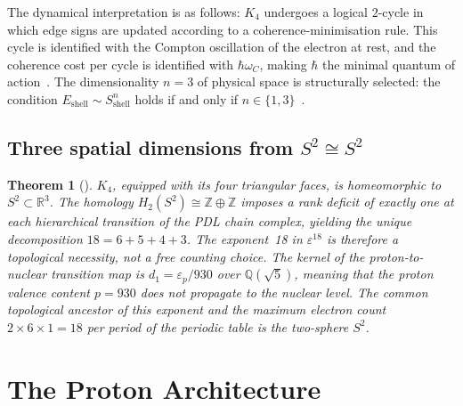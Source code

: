 \documentclass[11pt,a4paper]{article}
\theoremstyle{plain}
\newtheorem{theorem}{Theorem}[section]
\theoremstyle{definition}
\theoremstyle{remark}
\newcommand{\Kfour}{K_4}
\begin{document}
The dynamical interpretation is as follows: $\Kfour$ undergoes a logical $2$-cycle in which edge signs are updated according to a coherence-minimisation rule. This cycle is identified with the Compton oscillation of the electron at rest, and the coherence cost per cycle is identified with $\hbar\omega_C$, making $\hbar$ the minimal quantum of action~\cite{D01,D02}. The dimensionality $n=3$ of physical space is structurally selected: the condition $E_{\mathrm{shell}}\sim S_{\mathrm{shell}}^n$ holds if and only if $n\in\{1,3\}$~\cite{D23}.

\subsection{Three spatial dimensions from \texorpdfstring{$S^2\cong S^2$}{S² ≅ S²}}
\label{subsec:topology}
\begin{theorem}[\cite{D23}]
\label{thm:exponent18}
$K_4$, equipped with its four triangular faces, is homeomorphic to $S^2\subset\mathbb{R}^3$. The homology $H_2(S^2)\cong\mathbb{Z}\oplus\mathbb{Z}$ imposes a rank deficit of exactly one at each hierarchical transition of the PDL chain complex, yielding the unique decomposition $18=6+5+4+3$. The exponent~18 in $\varepsilon^{18}$ is therefore a topological necessity, not a free counting choice. The kernel of the proton-to-nuclear transition map is $d_1=\varepsilon_p/930$ over $\mathbb{Q}(\sqrt{5})$, meaning that the proton valence content $p=930$ does not propagate to the nuclear level. The common topological ancestor of this exponent and the maximum electron count $2\times 6\times 1=18$ per period of the periodic table is the two-sphere $S^2$.
\end{theorem}

\section{The Proton Architecture}
\label{sec:proton}
\end{document}
